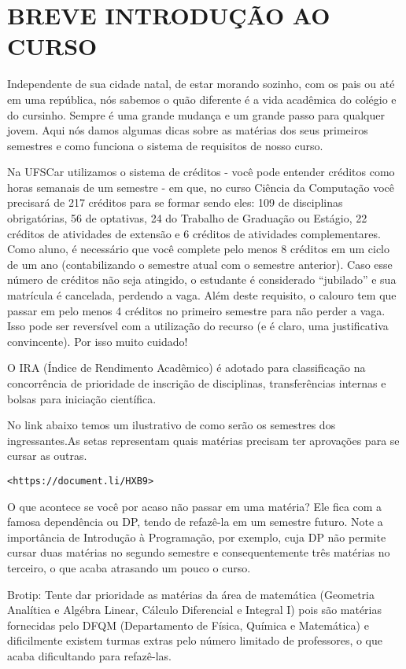 \section{BREVE INTRODUÇÃO AO CURSO}
Independente de sua cidade natal, de estar morando sozinho, com os pais ou até em uma república, nós sabemos o quão diferente é a vida acadêmica do colégio e do cursinho. Sempre é uma grande mudança e um grande passo para qualquer jovem. Aqui nós damos algumas dicas sobre as matérias dos seus primeiros semestres e como funciona o sistema de requisitos de nosso curso.

Na UFSCar utilizamos o sistema de créditos - você pode entender créditos como horas semanais de um semestre - em que, no curso Ciência da Computação você precisará de 217 créditos para se formar sendo eles: 109 de disciplinas obrigatórias, 56 de optativas, 24 do Trabalho de Graduação ou Estágio, 22 créditos de atividades de extensão e 6 créditos de atividades complementares. Como aluno, é necessário que você complete pelo menos 8 créditos em um ciclo de um ano (contabilizando o semestre atual com o semestre anterior). Caso esse número de créditos não seja atingido, o estudante é considerado ``jubilado'' e sua matrícula é cancelada, perdendo a vaga. Além deste requisito, o calouro tem que passar em pelo menos 4 créditos no primeiro semestre para não perder a vaga. Isso pode ser reversível com a utilização do recurso (e é claro, uma justificativa convincente). Por isso muito cuidado!

O IRA (Índice de Rendimento Acadêmico) é adotado para classificação na concorrência de prioridade de inscrição de disciplinas, transferências internas e bolsas para iniciação científica.

No link abaixo temos um ilustrativo de como serão os semestres dos ingressantes.As setas representam quais matérias precisam ter aprovações para se cursar as outras.

\texttt{<https://document.li/HXB9>}

O que acontece se você por acaso não passar em uma matéria? Ele fica com a
famosa dependência ou DP, tendo de refazê-la em um semestre futuro. Note a
importância de Introdução à Programação, por exemplo, cuja DP não permite
cursar duas matérias no segundo semestre e consequentemente três matérias no terceiro, o que acaba atrasando um pouco o curso.

Brotip: Tente dar prioridade as matérias da área de matemática (Geometria Analítica e Algébra Linear, Cálculo Diferencial e Integral I) pois são matérias fornecidas pelo DFQM (Departamento de Física, Química e Matemática)
e dificilmente existem turmas extras pelo número limitado de professores, o que acaba dificultando para refazê-las.
